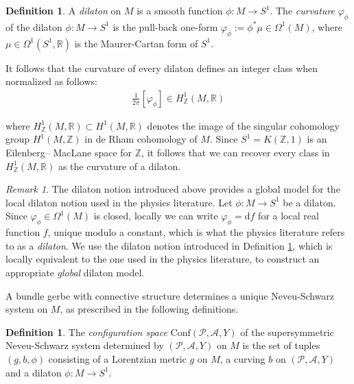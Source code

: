 \documentclass[10pt,reqno,a4paper]{amsart}
\theoremstyle{plain}
\theoremstyle{definition}
\newtheorem{definition}[thm]{Definition}
\theoremstyle{remark}
\newtheorem{remark}[thm]{Remark}
\theoremstyle{remark}
\def\dd{\mathrm{d}}
\def\Conf{\mathrm{Conf}}
\def\cA{\mathcal{A}}
\def\cP{\mathcal{P}}
\renewcommand{\(}{ (}
\renewcommand{\)}{ )}
\begin{document}
 \begin{definition}
 \label{def:dilaton}
 A \emph{dilaton} on $M$ is a smooth function $\phi \colon M \to S^1$. The \emph{curvature} $\varphi_{\phi}$ of the dilaton $\phi \colon M \to S^1$ is the pull-back one-form $\varphi_{\phi}  := \phi^{\ast}\mu \in \Omega^1(M)$, where $\mu\in \Omega^1(S^1,\mathbb{R})$ is the Maurer-Cartan form of $S^1$.
 \end{definition}
 
 \noindent
 It follows that the curvature of every dilaton defines an integer class when normalized as follows:
 \begin{eqnarray*}
 	\frac{1}{2\pi} [\varphi_{\phi}] \in H^1_{\mathbb{Z}}(M,\mathbb{R})
 \end{eqnarray*} 
 
 \noindent
 where $H^1_{\mathbb{Z}}(M,\mathbb{R}) \subset H^1(M,\mathbb{R})$ denotes the image of the singular cohomology group $H^1(M,\mathbb{Z})$ in de Rham cohomology of $M$. Since $S^1 = K(\mathbb{Z},1)$ is an Eilenberg-- MacLane space for $\mathbb{Z}$, it follows that we can recover every class in $H^1_{\mathbb{Z}}(M,\mathbb{R})$ as the curvature of a dilaton.  
 
 \begin{remark}
 The dilaton notion introduced above provides a global model for the local dilaton notion used in the physics literature. Let $\phi\colon M\to S^1$ be a dilaton. Since $\varphi_{\phi}\in \Omega^1(M)$ is closed, locally we can write $\varphi_{\phi} = \dd f$ for a local real function $f$, unique modulo a constant, which is what the physics literature refers to as a \emph{dilaton}. We use the dilaton notion introduced in Definition \ref{def:dilaton}, which is locally equivalent to the one used in the physics literature, to construct an appropriate \emph{global} dilaton model.
 \end{remark}
 
 \noindent
 A bundle gerbe with connective structure determines a unique Neveu-Schwarz system on $M$, as prescribed in the following definitions.  
 
 \begin{definition}
 The \emph{configuration space} $\Conf(\cP, \cA, Y)$ of the supersymmetric Neveu-Schwarz system determined by $(\cP, \cA, Y)$ on $M$ is the set of tuples $(g,b,\phi)$ consisting of a Lorentzian metric $g$ on $M$, a curving $b$ on $(\cP, \cA, Y)$ and a dilaton $\phi \colon M \to S^1$.
 \end{definition}
 
\end{document}
